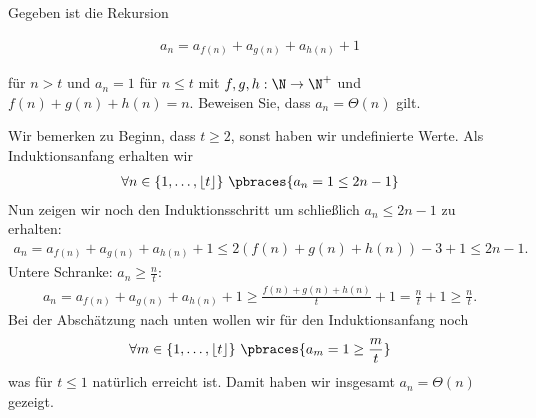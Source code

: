 
\begin{exercise}

Gegeben ist die Rekursion

\begin{align*}
  a_n = a_{f(n)} + a_{g(n)} + a_{h(n)} + 1
\end{align*}

für $n > t$ und $a_n = 1$ für $n \leq t$ mit $f,g,h: \N \rightarrow \N^+$ und $f(n) + g(n) + h(n) = n$. Beweisen Sie, dass $a_n = \Theta(n)$ gilt.
\end{exercise}


\begin{solution}
Wir bemerken zu Beginn, dass $t \geq 2$, sonst haben wir undefinierte Werte. Als Induktionsanfang erhalten wir 
\begin{align*}
\forall n \in \{1, \dots, \lfloor t \rfloor\} \ \pbraces{a_n = 1 \leq 2n - 1}
\end{align*}
Nun zeigen wir noch den Induktionsschritt um schließlich $a_n \leq 2n - 1$ zu erhalten:
\begin{align*}
  a_n = a_{f(n)} + a_{g(n)} + a_{h(n)} + 1 \leq 2(f(n) + g(n) + h(n)) - 3 + 1 \leq 2n - 1.
\end{align*}
Untere Schranke: $a_n \geq \frac{n}{t}$:
\begin{align*}
  a_n = a_{f(n)} + a_{g(n)} + a_{h(n)} + 1 \geq \frac{f(n) + g(n) + h(n)}{t} + 1 = \frac{n}{t} + 1 \geq \frac{n}{t}.
\end{align*}
Bei der Abschätzung nach unten wollen wir für den Induktionsanfang noch
\begin{align*}
\forall m \in \{1, \dots, \lfloor t \rfloor \} \ \pbraces{a_m = 1 \geq \frac{m}{t}}
\end{align*}
was für $t \leq 1$ natürlich erreicht ist. Damit haben wir insgesamt $a_n = \Theta(n)$ gezeigt.
\end{solution}

